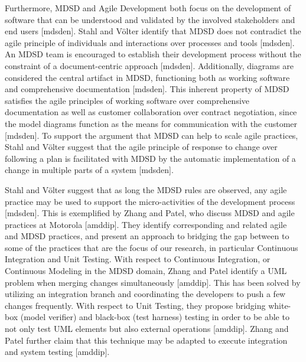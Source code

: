 \documentclass[fina_report_innit.tex]{subfiles}
\begin{document}
Furthermore, MDSD and Agile Development both focus on the development of software that can be understood and validated by the involved stakeholders and end users [mdsden]. Stahl and Völter identify that MDSD does not contradict the agile principle of individuals and interactions over processes and tools [mdsden]. An MDSD team is encouraged to establish their development process without the constraint of a document-centric approach [mdsden]. Additionally, diagrams are considered the central artifact in MDSD, functioning both as working software and comprehensive documentation [mdsden]. This inherent property of MDSD satisfies the agile principles of working software over comprehensive documentation as well as customer collaboration over contract negotiation, since the model diagrams function as the means for communication with the customer [mdsden]. To support the argument that MDSD can help to scale agile practices, Stahl and Völter suggest that the agile principle of response to change over following a plan is facilitated with MDSD by the automatic implementation of a change in multiple parts of a system [mdsden].

Stahl and Völter suggest that as long the MDSD rules are observed, any agile practice may be used to support the micro-activities of the development process [mdsden]. This is exemplified by Zhang and Patel, who discuss MDSD and agile practices at Motorola [amddip]. They identify corresponding and related agile and MDSD practices, and present an approach to bridging the gap between to some of the practices that are the focus of our research, in particular Continuous Integration and Unit Testing. With respect to Continuous Integration, or Continuous Modeling in the MDSD domain, Zhang and Patel identify a UML problem when merging changes simultaneously [amddip]. This has been solved by utilizing an integration branch and coordinating the developers to push a few changes frequently. With respect to Unit Testing, they propose bridging white-box (model verifier) and black-box (test harness) testing in order to be able to not only test UML elements but also external operations [amddip]. Zhang and Patel further claim that this technique may be adapted to execute integration and system testing [amddip].
\end{document}
